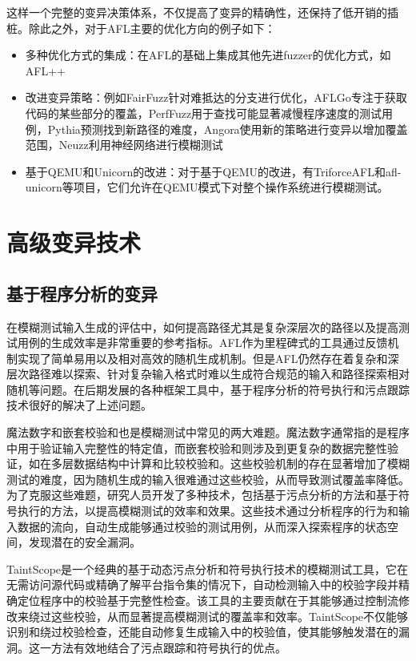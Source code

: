 \documentclass[10.5pt,compsoc]{CjC}
\theoremstyle{mystyle}
\begin{document}
这样一个完整的变异决策体系，不仅提高了变异的精确性，还保持了低开销的插桩。除此之外，对于AFL主要的优化方向的例子如下：

\begin{itemize}
  \item 多种优化方式的集成：在AFL的基础上集成其他先进fuzzer的优化方式，如AFL++\cite{Fioraldi}
  \item 改进变异策略：例如FairFuzz针对难抵达的分支进行优化，AFLGo专注于获取代码的某些部分的覆盖，PerfFuzz用于查找可能显著减慢程序速度的测试用例，Pythia预测找到新路径的难度，Angora使用新的策略进行变异以增加覆盖范围，Neuzz利用神经网络进行模糊测试\cite{Chang}
  \item 基于QEMU和Unicorn的改进：对于基于QEMU的改进，有TriforceAFL和afl-unicorn等项目，它们允许在QEMU模式下对整个操作系统进行模糊测试\cite{Chang}。
\end{itemize}

\section{高级变异技术}

\subsection{基于程序分析的变异}
在模糊测试输入生成的评估中，如何提高路径尤其是复杂深层次的路径以及提高测试用例的生成效率是非常重要的参考指标。AFL作为里程碑式的工具通过反馈机制实现了简单易用以及相对高效的随机生成机制。但是AFL仍然存在着复杂和深层次路径难以探索、针对复杂输入格式时难以生成符合规范的输入和路径探索相对随机等问题。在后期发展的各种框架工具中，基于程序分析的符号执行和污点跟踪技术很好的解决了上述问题。

魔法数字和嵌套校验和也是模糊测试中常见的两大难题。魔法数字通常指的是程序中用于验证输入完整性的特定值，而嵌套校验和则涉及到更复杂的数据完整性验证，如在多层数据结构中计算和比较校验和。这些校验机制的存在显著增加了模糊测试的难度，因为随机生成的输入很难通过这些校验，从而导致测试覆盖率降低。为了克服这些难题，研究人员开发了多种技术，包括基于污点分析的方法和基于符号执行的方法，以提高模糊测试的效率和效果。这些技术通过分析程序的行为和输入数据的流向，自动生成能够通过校验的测试用例，从而深入探索程序的状态空间，发现潜在的安全漏洞。

TaintScope\cite{TaintScope}是一个经典的基于动态污点分析和符号执行技术的模糊测试工具，它在无需访问源代码或精确了解平台指令集的情况下，自动检测输入中的校验字段并精确定位程序中的校验基于完整性检查。该工具的主要贡献在于其能够通过控制流修改来绕过这些校验，从而显著提高模糊测试的覆盖率和效率。TaintScope不仅能够识别和绕过校验检查，还能自动修复生成输入中的校验值，使其能够触发潜在的漏洞。这一方法有效地结合了污点跟踪和符号执行的优点。
\end{document}
